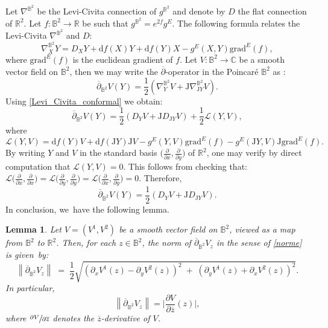 \documentclass[10pt]{amsart}
\theoremstyle{plain}
\newtheorem{lemma}[cor]{Lemma}
\theoremstyle{definition}
\newcommand{\J}{\mathrm{J}}
\begin{document}
Let $\nabla^{\mathbb{B}^2}$ be the Levi-Civita connection of $g^{\mathbb{B}^2}$ and denote by $D$ the flat connection of $\mathbb{R}^2$. Let $f:\mathbb{B}^2\to\mathbb{R}$ be such that $g^{\mathbb{B}^2}=e^{2f}g^E$. The following formula relates the Levi-Civita $\nabla^{\mathbb{B}^2}$ and $D$:
\begin{equation}\label{Levi_Civita_conformal}
\nabla^{\mathbb{B}^2}_XY=D_XY+\mathrm{d}f(X)Y+\mathrm{d}f(Y)X-g^E(X,Y)\mathrm{grad}^E(f),
\end{equation}
where $\mathrm{grad}^E(f)$ is the euclidean gradient of $f$. Let $V:\mathbb{B}^2\to\mathbb{C}$ be a smooth vector field on $\mathbb{B}^2$, then we may write the $\overline{\partial}$-operator in the Poincaré $\mathbb{B}^2$ as :
\begin{equation}\label{dbar_B2}
\overline{\partial}_{\mathbb{B}^2}V(Y)=\frac{1}{2}(\nabla^{\mathbb{B}^2}_YV+\J\nabla^{\mathbb{B}^2}_{\J Y}V).
\end{equation}
Using \eqref{Levi_Civita_conformal} we obtain:
\begin{equation}\label{eq_53}
\overline{\partial}_{\mathbb{B}^2}V(Y)=\frac{1}{2} (D_YV+\J D_{\J Y}V)+\frac{1}{2} \mathcal{L}(Y,V),
\end{equation}
where
\[
\mathcal{L}(Y,V)=\mathrm{d}f(Y)V+ \mathrm{d}f(\J Y)\J V-g^{E}(Y,V)\mathrm{grad}^E(f)-g^{E}(\J Y,V)\J\mathrm{grad}^E(f).
\]
By writing \(Y \) and \(V \) in the standard basis \(\bigl(\frac{\partial}{\partial x}, \frac{\partial}{\partial y}\bigr) \) of \(\mathbb{R}^2 \), one may verify by direct computation that \(\mathcal{L}(Y, V) = 0 \). This follows from checking that:
$
\mathcal{L}\bigl(\frac{\partial}{\partial x}, \frac{\partial}{\partial x} \bigr)
= \mathcal{L}\bigl(\frac{\partial}{\partial y}, \frac{\partial}{\partial y} \bigr)
= \mathcal{L}\bigl(\frac{\partial}{\partial x}, \frac{\partial}{\partial y} \bigr)
= 0
$.
Therefore,
\begin{equation}\label{dbar_relation0}
\overline{\partial}_{\mathbb{B}^2}V(Y)=\frac{1}{2}(D_YV + \mathrm{J} D_{\mathrm{J}Y}V).
\end{equation}
In conclusion, we~have the following lemma.

\begin{lemma}\label{same_d_bar}
Let \(V = (V^1, V^2) \) be a smooth vector field on \(\mathbb{B}^2 \), viewed as a map from \(\mathbb{B}^2 \) to \(\mathbb{R}^2 \). Then, for each \(z \!\in\! \mathbb{B}^2 \), the norm of \(\overline{\partial}_{\mathbb{B}^2}V_z \) in the sense of \eqref{norme} is given~by:
\[
\left\lVert\overline\partial_{\mathbb{B}^2}V_z\right\rVert
\;=\;
\frac{1}{2}
\sqrt{
\left(\partial_x V^1(z) - \partial_y V^2(z)\right)^2
\;+\;
\left(\partial_y V^1(z) + \partial_x V^2(z)\right)^2
}.
\]
In particular,
\begin{equation}\label{norme2}
\left\lVert \overline{\partial}_{\mathbb{B}^2} V_z \right\rVert = \biggl| \frac{\partial V}{\partial \overline{z}}(z) \biggr|,
\end{equation}
where \(\sfrac{\partial V}{\partial \overline{z}} \) denotes the \(\overline{z} \)-derivative of \(V \).
\end{lemma}
\end{document}
